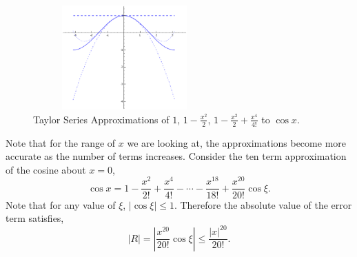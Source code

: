 \begin{example}
{\begin{figure}[h!]
\begin{minipage}{\textwidth}
\begin{center}
\includegraphics[height=4cm,width=7cm]{taycos3.eps}
\end{center}
\end{minipage}
\caption{Taylor Series Approximations of $1$, $1-\frac{x^2}{2}$, $1-\frac{x^2}{2}+\frac{x^4}{4!}$ to $\cos x$.}
\label{fig:taycos4}
\label{taycos4}
\end{figure}

  Note that for the range of $x$ we are looking at, the approximations
  become more accurate as the number of terms increases.
  Consider the ten term approximation of the cosine about $x = 0$,
  \[
  \cos x = 1 - \frac{x^2}{2!} + \frac{x^4}{4!} - \cdots - \frac{x^{18}}{18!} 
  + \frac{x^{20}}{20!} \cos \xi.
  \]
  Note that for any value of $\xi$, $|\cos \xi| \leq 1$.  Therefore the absolute
  value of the error term satisfies,
  \[
  | R | = \left| \frac{x^{20}}{20!} \cos \xi \right| \leq \frac{|x|^{20}}{20!}.
  \]



}
\end{example}
